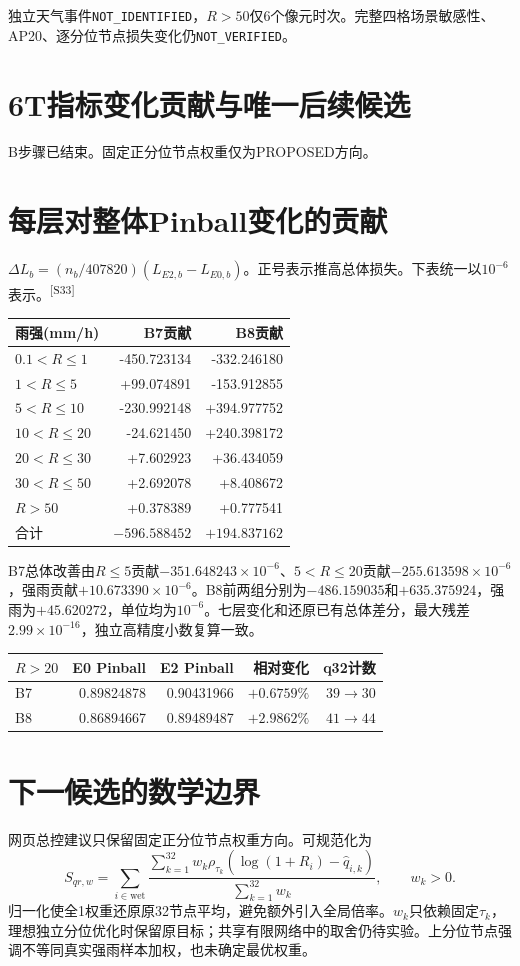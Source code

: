 \documentclass[UTF8,10.5pt,a4paper,fontset=none]{ctexart}
\newcommand{\evi}[1]{\textsuperscript{\color{muted}[#1]}}
\newcommand{\pageheading}[2]{\clearpage\section*{#1}\textcolor{muted}{#2}\par\vspace{3pt}}
\begin{document}
独立天气事件\texttt{NOT\_IDENTIFIED}，$R>50$仅6个像元时次。完整四格场景敏感性、AP20、逐分位节点损失变化仍\texttt{NOT\_VERIFIED}。

\pageheading{6T\quad 指标变化贡献与唯一后续候选}{B步骤已结束。固定正分位节点权重仅为PROPOSED方向。}
\section*{每层对整体Pinball变化的贡献}
$\Delta L_b=(n_b/407820)(L_{E2,b}-L_{E0,b})$。正号表示推高总体损失。下表统一以$10^{-6}$表示。\evi{S33}

\begin{tabularx}{\textwidth}{@{}lrr@{}}
\toprule 雨强(mm/h) & B7贡献 & B8贡献\\\midrule
$0.1<R\leq1$ & -450.723134 & -332.246180\\
$1<R\leq5$ & +99.074891 & -153.912855\\
$5<R\leq10$ & -230.992148 & +394.977752\\
$10<R\leq20$ & -24.621450 & +240.398172\\
$20<R\leq30$ & +7.602923 & +36.434059\\
$30<R\leq50$ & +2.692078 & +8.408672\\
$R>50$ & +0.378389 & +0.777541\\
\midrule 合计 & $-596.588452$ & $+194.837162$\\\bottomrule
\end{tabularx}

B7总体改善由$R\leq5$贡献$-351.648243\times10^{-6}$、$5<R\leq20$贡献$-255.613598\times10^{-6}$，强雨贡献$+10.673390\times10^{-6}$。B8前两组分别为$-486.159035$和$+635.375924$，强雨为$+45.620272$，单位均为$10^{-6}$。七层变化和还原已有总体差分，最大残差$2.99\times10^{-16}$，独立高精度小数复算一致。

\begin{tabularx}{\textwidth}{@{}lrrrr@{}}
\toprule $R>20$ & E0 Pinball & E2 Pinball & 相对变化 & q32计数\\\midrule
B7 & 0.89824878 & 0.90431966 & $+0.6759\%$ & $39\to30$\\
B8 & 0.86894667 & 0.89489487 & $+2.9862\%$ & $41\to44$\\\bottomrule
\end{tabularx}

\section*{下一候选的数学边界}
网页总控建议只保留固定正分位节点权重方向。可规范化为
\[S_{qr,w}=\sum_{i\in\mathrm{wet}}\frac{\sum_{k=1}^{32} w_k\rho_{\tau_k}(\log(1+R_i)-\widehat q_{i,k})}{\sum_{k=1}^{32}w_k},\qquad w_k>0.\]
归一化使全1权重还原原32节点平均，避免额外引入全局倍率。$w_k$只依赖固定$\tau_k$，理想独立分位优化时保留原目标；共享有限网络中的取舍仍待实验。上分位节点强调不等同真实强雨样本加权，也未确定最优权重。
\end{document}
